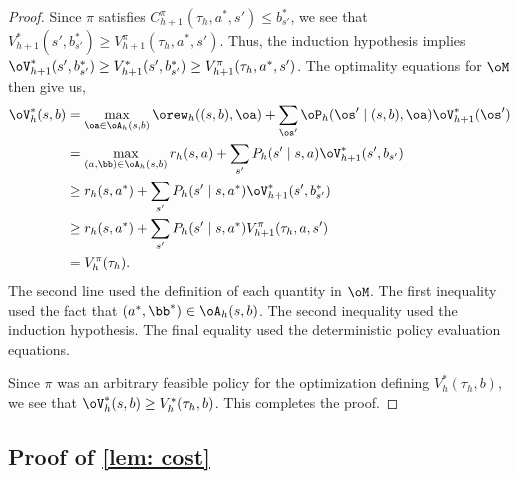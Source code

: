\documentclass[pdftex, a4paper, 12pt]{article}
\begin{document}
\begin{proof}
    Since $\pi$ satisfies $C_{h+1}^{\pi}(\tau_h, a^*, s') \leq b_{s'}^*$, we see that $V^*_{h+1}(s', b_{s'}^*) \geq V^{\pi}_{h+1}(\tau_h, a^*, s')$. Thus, the induction hypothesis implies $\oV^*_{h+1}(s', b_{s'}^*) \geq V^*_{h+1}(s', b_{s'}^*) \geq V^{\pi}_{h+1}(\tau_h, a^*, s')$.
    The optimality equations for $\oM$ then give us,
    \begin{align*}
        \oV^*_h(s,b) &= \max_{\oa \in \oA_h(s,b)} \orew_h((s,b),\oa) + \sum_{\os'} \oP_h(\os' \mid (s,b), \oa) \oV^*_{h+1}(\os')\\
        &=\max_{(a,\bb) \in \oA_h(s,b)} r_h(s, a) + \sum_{s'} P_h(s' \mid s,a) \oV^*_{h+1}(s',b_{s'}) \\
        &\geq r_h(s, a^*) + \sum_{s'} P_h(s' \mid s,a^*) \oV^*_{h+1}(s',b_{s'}^*) \\
        &\geq r_h(s, a^*) + \sum_{s'} P_h(s' \mid s,a^*) V^{\pi}_{h+1}(\tau_h, a, s') \\
        &= V_h^{\pi}(\tau_h).
    \end{align*}
    The second line used the definition of each quantity in $\oM$.
    The first inequality used the fact that $(a^*, \bb^*) \in \oA_h(s,b)$. The second inequality used the induction hypothesis. The final equality used the deterministic policy evaluation equations.

    Since $\pi$ was an arbitrary feasible policy for the optimization defining $V^*_h(\tau_h,b)$, we see that $\oV_h^*(s,b) \geq V^*_h(\tau_h, b)$. This completes the proof.
    
\end{proof}


\subsection{Proof of \texorpdfstring{\cref{lem: cost}}{lem: cost}}
\end{document}
